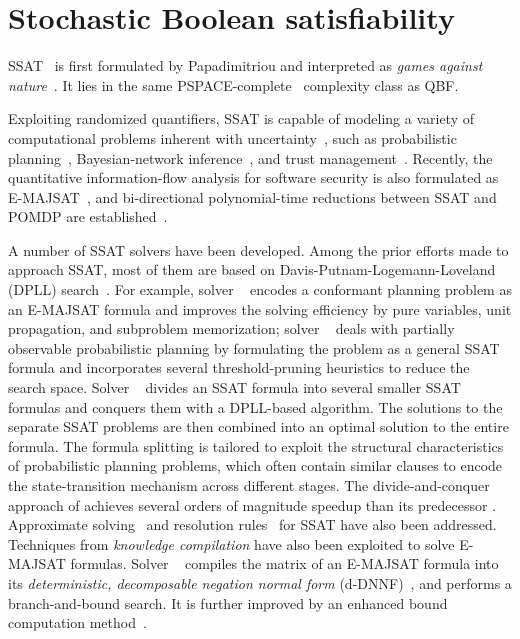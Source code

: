 \section{Stochastic Boolean satisfiability}
\label{sect:related-work-ssat}

SSAT~\cite{Littman2001,SATHandbook-SSAT} is first formulated by Papadimitriou
and interpreted as \textit{games against nature}~\cite{Papadimitriou1985}.
It lies in the same PSPACE-complete~\cite{Stockmeyer1973} complexity class as QBF.

Exploiting randomized quantifiers,
SSAT is capable of modeling a variety of computational problems inherent with uncertainty~\cite{Hnich2011},
such as probabilistic planning~\cite{Kushmerick1995,Littman1998},
Bayesian-network inference~\cite{Cooper1990,Jensen1996,Dechter1998,Bacchus2003},
and trust management~\cite{SATHandbook-SSAT}.
Recently, the quantitative information-flow analysis for software security is also formulated
as E-MAJSAT~\cite{Fremont2017},
and bi-directional polynomial-time reductions between SSAT and POMDP are established~\cite{Salmon2020}.

A number of SSAT solvers have been developed.
Among the prior efforts made to approach SSAT,
most of them are based on Davis-Putnam-Logemann-Loveland (DPLL) search~\cite{Davis1962}.
For example,
solver \maxplan~\cite{Majercik1998} encodes a conformant planning problem as an E-MAJSAT formula
and improves the solving efficiency by pure variables, unit propagation, and subproblem memorization;
solver \zander~\cite{Majercik2003} deals with partially observable probabilistic planning by formulating the problem as a general SSAT formula and incorporates several threshold-pruning heuristics to reduce the search space.
Solver \dcssat~\cite{Majercik2005} divides an SSAT formula into several smaller SSAT formulas and conquers them with a DPLL-based algorithm.
The solutions to the separate SSAT problems are then combined into an optimal solution to the entire formula.
The formula splitting is tailored to exploit the structural characteristics of probabilistic planning problems,
which often contain similar clauses to encode the state-transition mechanism across different stages.
The divide-and-conquer approach of \dcssat achieves several orders of magnitude speedup than its predecessor \zander.
Approximate solving~\cite{Majercik2007} and resolution rules~\cite{Teige2010} for SSAT have also been addressed.
Techniques from \textit{knowledge compilation} have also been exploited to solve E-MAJSAT formulas.
Solver \complan~\cite{Huang2006} compiles the matrix of an E-MAJSAT formula into its
\textit{deterministic, decomposable negation normal form} (d-DNNF)~\cite{Darwiche2001,Darwiche2002dDNNF},
and performs a branch-and-bound search.
It is further improved by an enhanced bound computation method~\cite{Pipatsrisawat2009}.